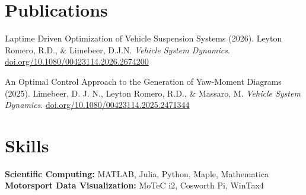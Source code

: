 \documentclass[12pt,letterpaper]{article} %
\begin{document}
\vspace{-18.5pt} %


\section*{Publications}

Laptime Driven Optimization of Vehicle Suspension Systems (2026). Leyton Romero, R.D., \& Limebeer, D.J.N. \textit{Vehicle System Dynamics}. \href{https://doi.org/10.1080/00423114.2026.2674200}{doi.org/10.1080/00423114.2026.2674200}
\vspace{5pt}

An Optimal Control Approach to the Generation of Yaw-Moment Diagrams (2025). Limebeer, D. J. N., Leyton Romero, R.D., \& Massaro, M. \textit{Vehicle System Dynamics}. \href{https://doi.org/10.1080/00423114.2025.2471344}{doi.org/10.1080/00423114.2025.2471344}

\vspace{-10.5pt} %


\section*{Skills}
\textbf{Scientific Computing:} MATLAB, Julia, Python, Maple, Mathematica \\
\textbf{Motorsport Data Visualization:} MoTeC i2, Cosworth Pi, WinTax4 \\

\vspace{-10.5pt} %

\end{document}
